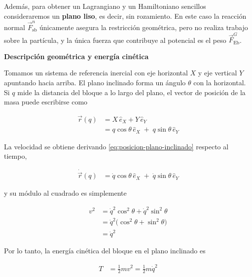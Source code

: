 \documentclass{article}
\begin{document}
Además, para obtener un Lagrangiano y un Hamiltoniano sencillos consideraremos un
\textbf{plano liso}, es decir, sin rozamiento. En este caso la reacción normal
\(\vec F^{n}_{\text{sb}}\) únicamente asegura la restricción geométrica, pero no
realiza trabajo sobre la partícula, y la única fuerza que contribuye al potencial
es el peso \(\vec F^{G}_{\text{Eb}}\).

\vspace{0.5cm}
\textbf{Descripción geométrica y energía cinética}

Tomamos un sistema de referencia inercial con eje horizontal \(X\) y eje vertical
\(Y\) apuntando hacia arriba. El plano inclinado forma un ángulo \(\theta\) con la
horizontal. Si \(q\) mide la distancia del bloque a lo largo del plano, el vector
de posición de la masa puede escribirse como

\begin{equation}
\begin{split}
\vec r(q)
&= X\,\hat e_{X} + Y\,\hat e_{Y} \\[4pt]
&= q\cos\theta\,\hat e_{X}
 \;+\; q\sin\theta\,\hat e_{Y}
\end{split}\label{eq:posicion-plano-inclinado}
\end{equation}

La velocidad se obtiene derivando \eqref{eq:posicion-plano-inclinado} respecto al
tiempo,

\begin{equation}
\begin{split}
\dot{\vec r}(q)
&= \dot q\cos\theta\,\hat e_{X}
 \;+\; \dot q\sin\theta\,\hat e_{Y}
\end{split}\label{eq:velocidad-plano-inclinado}
\end{equation}

y su módulo al cuadrado es simplemente

\begin{equation}
\begin{split}
v^{2}
&= \dot q^{2}\cos^{2}\theta + \dot q^{2}\sin^{2}\theta \\[4pt]
&= \dot q^{2}\bigl(\cos^{2}\theta+\sin^{2}\theta\bigr) \\[4pt]
&= \dot q^{2}
\end{split}\label{eq:rapidez-plano-inclinado}
\end{equation}

Por lo tanto, la energía cinética del bloque en el plano inclinado es

\begin{equation}
\begin{split}
T &= \frac{1}{2}m v^{2}
   = \frac{1}{2}m\dot q^{2}
\end{split}\label{eq:T-plano-inclinado}
\end{equation}
\end{document}
